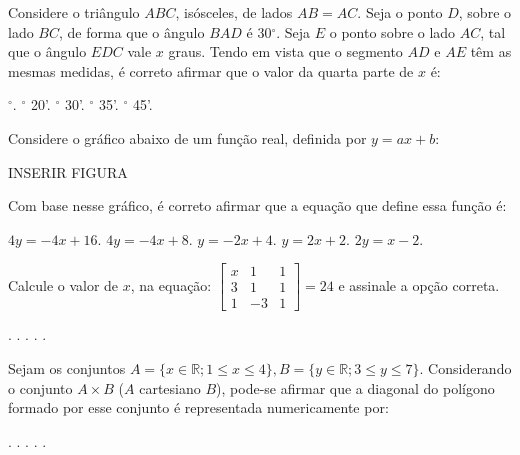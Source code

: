 \begin{question}%
Considere o triângulo \(ABC\), isósceles, de lados \(AB=AC\). Seja o ponto \(D\), sobre o lado \(BC\), de forma que o ângulo \(BAD\) é 30\(^\circ\). Seja \(E\) o ponto sobre o lado \(AC\), tal que o ângulo \(EDC\) vale \(x\) graus. Tendo em vista que o segmento \(AD\) e \(AE\) têm as mesmas medidas, é correto afirmar que o valor da quarta parte de \(x\) é:
    \begin{tasks}
        \(^\circ\).
        \(^\circ\) 20'.
        \(^\circ\) 30'.
        \(^\circ\) 35'.
        \(^\circ\) 45'.
    \end{tasks}
\end{question}

\begin{question}%
Considere o gráfico abaixo de um função real, definida por \(y= ax + b\):

INSERIR FIGURA

Com base nesse gráfico, é correto afirmar que a equação que define essa função é:
    \begin{tasks}
        \task \(4y = -4x + 16\).
        \task \(4y = -4x + 8\).
        \task \(y = -2x + 4\).
        \task \(y= 2x + 2\).
        \task \(2y = x-2\).
    \end{tasks}
\end{question}

\begin{question}%
Calcule o valor de \(x\), na equação: 
\(\begin{bmatrix}
x & 1  & 1\\
3 & 1 & 1\\
1 & -3 & 1
\end{bmatrix}
=24 \) e assinale a opção correta.
    \begin{tasks}
        .
        .
        .
        .
        .
    \end{tasks}
\end{question}

\begin{question}%
Sejam os conjuntos \(A=\{x \in \mathbb{R}; 1 \leq x \leq 4\}, B = \{ y \in \mathbb{R}; 3 \leq y \leq 7\}\). Considerando o conjunto \(A \times B\) (\(A\) cartesiano \(B\)), pode-se afirmar que a diagonal do polígono formado por esse conjunto é representada numericamente por:
    \begin{tasks}
        .
        .
        .
        .
        .
    \end{tasks}
\end{question}

